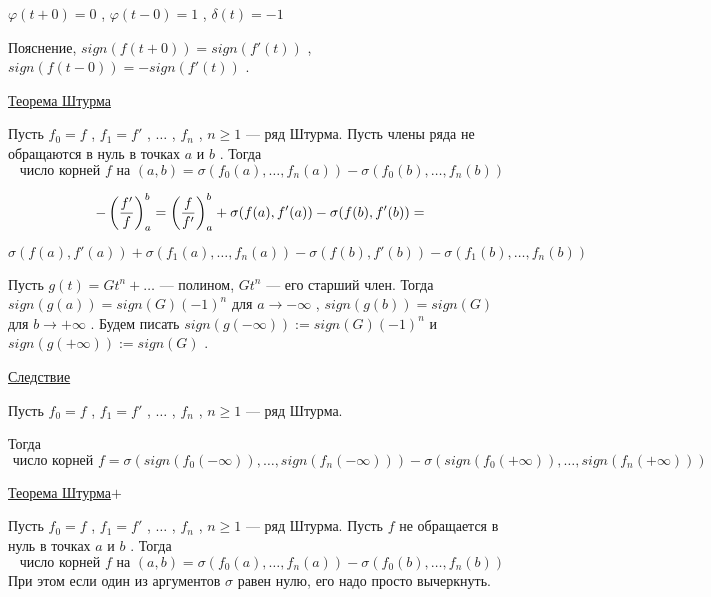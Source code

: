 \vspace


\vspace

\( \varphi(t+0) = 0 \) , \( \varphi(t-0) = 1 \) , \( \delta(t) = -1 \)

\vspace

Пояснение, \( sign(f(t+0)) = sign(f'(t)) \) , \( sign(f(t-0)) = - sign(f'(t)) \) .

\SSendp

\SSsect[!!] \underline{Теорема Штурма}

\vspace

Пусть \( f_0 = f \) , \( f_1=f' \) , \( \dots \) , \( f_n \) , \( n \geqslant 1 \) --- ряд Штурма.
Пусть члены ряда не обращаются в нуль в точках \( a \) и \( b \) .
Тогда 
\[ \text{ число корней } f \text{ на } (a,b) = \sigma(f_0(a),\dots,f_n(a)) - \sigma(f_0(b),\dots,f_n(b)) \]

\SSproof

\[ - \left( \frac{f'}{f} \right)^b_a = \left( \frac{f}{f'} \right)^b_a + \sigma(f(a),f'(a)) - \sigma(f(b),f'(b)) = \]

\[ \sigma(f(a),f'(a)) + \sigma(f_1(a),\dots,f_n(a)) - \sigma(f(b),f'(b)) - \sigma(f_1(b),\dots,f_n(b)) \]

\SSendp

\SSsect Пусть \( g(t) = Gt^n+\dots \) --- полином, \( Gt^n \) --- его старший член.
Тогда \( sign(g(a)) = sign(G)(-1)^n \) для \( a \rightarrow -\infty \) ,
\( sign(g(b)) = sign(G) \) для \( b \rightarrow +\infty \) . 
Будем писать \( sign(g(-\infty)) := sign(G)(-1)^n \) и \( sign(g(+\infty)) := sign(G) \) .

\SSsect \underline{Следствие}

\vspace

Пусть \( f_0 = f \) , \( f_1=f' \) , \( \dots \) , \( f_n \) , \( n \geqslant 1 \) --- ряд Штурма.

Тогда 
\[ \text{ число корней } f = \sigma(sign(f_0(-\infty)),\dots,sign(f_n(-\infty))) - \sigma(sign(f_0(+\infty)),\dots,sign(f_n(+\infty))) \]

\SSsect \underline{Теорема Штурма\(+\)}

\vspace

Пусть \( f_0 = f \) , \( f_1=f' \) , \( \dots \) , \( f_n \) , \( n \geqslant 1 \) --- ряд Штурма. Пусть \( f \) не обращается в нуль в точках \( a \) и \( b \) .
Тогда 
\[ \text{ число корней } f \text{ на } (a,b) = \sigma(f_0(a),\dots,f_n(a)) - \sigma(f_0(b),\dots,f_n(b)) \]
При этом если один из аргументов \( \sigma \) равен нулю, его надо просто вычеркнуть.



